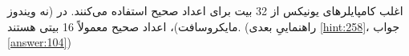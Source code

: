 \section{}
\paragraph{}\label{hint:223}
اغلب کامپایلرهای یونیکس از 32 بیت برای اعداد صحیح استفاده می‌کنند. در  (نه ویندوز مایکروسافت)، اعداد صحیح معمولاً 16 بیتی هستند. (راهنماییِ بعدی \ref{hint:258}، جواب \ref{answer:104})